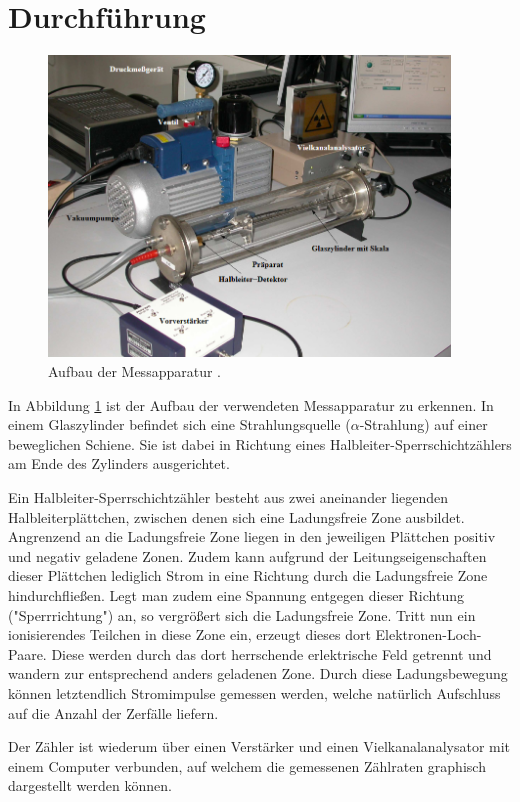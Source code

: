 \section{Durchführung}
\label{sec:Durchführung}

\begin{figure}[H]
  \centering
  \includegraphics[height=8cm]{Aufbau.PNG}
  \caption{Aufbau der Messapparatur \cite{sample}.}
  \label{fig:aufbau}
\end{figure}

In Abbildung \ref{fig:aufbau} ist der Aufbau der verwendeten Messapparatur zu erkennen.
In einem Glaszylinder befindet sich eine Strahlungsquelle ($\alpha$-Strahlung) auf einer
beweglichen Schiene. Sie ist dabei in Richtung eines Halbleiter-Sperrschichtzählers am Ende
des Zylinders ausgerichtet.

Ein Halbleiter-Sperrschichtzähler besteht aus zwei aneinander liegenden Halbleiterplättchen,
zwischen denen sich eine Ladungsfreie Zone ausbildet. Angrenzend an die Ladungsfreie Zone liegen in den jeweiligen Plättchen
positiv und negativ geladene Zonen. Zudem kann aufgrund der Leitungseigenschaften
dieser Plättchen lediglich Strom in eine Richtung durch die Ladungsfreie Zone hindurchfließen. Legt man zudem eine Spannung
entgegen dieser Richtung ("Sperrrichtung") an, so vergrößert sich die Ladungsfreie Zone. Tritt nun ein ionisierendes
Teilchen in diese Zone ein, erzeugt dieses dort Elektronen-Loch-Paare. Diese werden durch das dort herrschende erlektrische Feld
getrennt und wandern zur entsprechend anders geladenen Zone. Durch diese Ladungsbewegung können letztendlich Stromimpulse gemessen werden,
welche natürlich Aufschluss auf die Anzahl der Zerfälle liefern.

Der Zähler ist wiederum über einen Verstärker und einen Vielkanalanalysator mit einem
Computer verbunden, auf welchem die gemessenen Zählraten graphisch dargestellt werden können.

